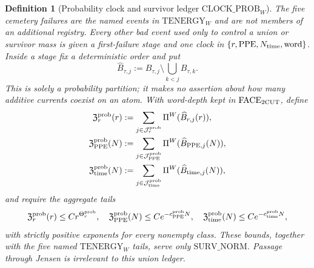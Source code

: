 \documentclass[11pt]{article}
\newtheorem{definition}[theorem]{Definition}
\begin{document}
\begin{definition}[Probability clock and survivor ledger
$\mathrm{CLOCK\_PROB}_{W}$]
\label{def:probability-clock}
The five cemetery failures are the named events in
$\mathrm{TENERGY}_{W}$ and are not members of an additional registry.
Every other bad event used only to control a union or survivor mass is given
a first-failure stage and one clock in
$\{r,\mathrm{PPE},N_{\rm time},\mathrm{word}\}$.  Inside a stage fix a
deterministic order and put
\begin{equation}
\label{eq:clock-prob-first-hit}
 \widehat B_{\tau,j}:=B_{\tau,j}\setminus\bigcup_{k<j}B_{\tau,k}.
\end{equation}
This is solely a probability partition; it makes no assertion about how many
additive currents coexist on an atom.  With word-depth kept in
$\mathrm{FACE}_{\rm 2CUT}$, define
\begin{align}
 \mathfrak Z_{r}^{\rm prob}(r)
 &:=\sum_{j\in\mathcal J_r^{\rm prob}}
      \Pi^W(\widehat B_{r,j}(r)),\notag\\
 \mathfrak Z_{\rm PPE}^{\rm prob}(N)
 &:=\sum_{j\in\mathcal J_{\rm PPE}^{\rm prob}}
      \Pi^W(\widehat B_{{\rm PPE},j}(N)),\notag\\
 \mathfrak Z_{\rm time}^{\rm prob}(N)
 &:=\sum_{j\in\mathcal J_{\rm time}^{\rm prob}}
      \Pi^W(\widehat B_{{\rm time},j}(N)),
 \label{eq:clock-prob-partitions}
\end{align}
and require the aggregate tails
\begin{equation}
\label{eq:clock-prob-tails}
 \mathfrak Z_r^{\rm prob}(r)\le Cr^{\Theta_r^{\rm prob}},\quad
 \mathfrak Z_{\rm PPE}^{\rm prob}(N)\le Ce^{-c_{\rm PPE}^{\rm prob}N},
 \quad
 \mathfrak Z_{\rm time}^{\rm prob}(N)\le Ce^{-c_{\rm time}^{\rm prob}N},
\end{equation}
with strictly positive exponents for every nonempty class.  These bounds,
together with the five named $\mathrm{TENERGY}_{W}$ tails, serve only
$\mathrm{SURV\_NORM}$.  Passage through Jensen is irrelevant to this union
ledger.
\end{definition}
\end{document}

